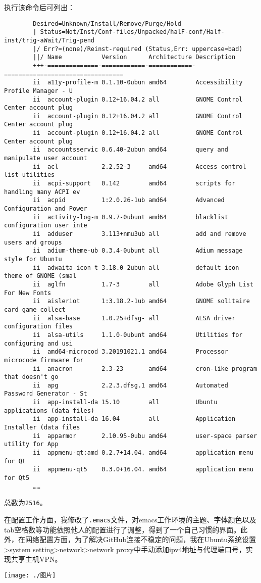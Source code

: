 \documentclass[hyperref,UTF8]{ctexart}
\begin{document}
	执行该命令后可列出：
	\begin{verbatim}
		Desired=Unknown/Install/Remove/Purge/Hold
		| Status=Not/Inst/Conf-files/Unpacked/halF-conf/Half-inst/trig-aWait/Trig-pend
		|/ Err?=(none)/Reinst-required (Status,Err: uppercase=bad)
		||/ Name           Version      Architecture Description
		+++-==============-============-============-=================================
		ii  a11y-profile-m 0.1.10-0ubun amd64        Accessibility Profile Manager - U
		ii  account-plugin 0.12+16.04.2 all          GNOME Control Center account plug
		ii  account-plugin 0.12+16.04.2 all          GNOME Control Center account plug
		ii  account-plugin 0.12+16.04.2 all          GNOME Control Center account plug
		ii  accountsservic 0.6.40-2ubun amd64        query and manipulate user account
		ii  acl            2.2.52-3     amd64        Access control list utilities
		ii  acpi-support   0.142        amd64        scripts for handling many ACPI ev
		ii  acpid          1:2.0.26-1ub amd64        Advanced Configuration and Power 
		ii  activity-log-m 0.9.7-0ubunt amd64        blacklist configuration user inte
		ii  adduser        3.113+nmu3ub all          add and remove users and groups
		ii  adium-theme-ub 0.3.4-0ubunt all          Adium message style for Ubuntu
		ii  adwaita-icon-t 3.18.0-2ubun all          default icon theme of GNOME (smal
		ii  aglfn          1.7-3        all          Adobe Glyph List For New Fonts
		ii  aisleriot      1:3.18.2-1ub amd64        GNOME solitaire card game collect
		ii  alsa-base      1.0.25+dfsg- all          ALSA driver configuration files
		ii  alsa-utils     1.1.0-0ubunt amd64        Utilities for configuring and usi
		ii  amd64-microcod 3.20191021.1 amd64        Processor microcode firmware for 
		ii  anacron        2.3-23       amd64        cron-like program that doesn't go
		ii  apg            2.2.3.dfsg.1 amd64        Automated Password Generator - St
		ii  app-install-da 15.10        all          Ubuntu applications (data files)
		ii  app-install-da 16.04        all          Application Installer (data files
		ii  apparmor       2.10.95-0ubu amd64        user-space parser utility for App
		ii  appmenu-qt:amd 0.2.7+14.04. amd64        application menu for Qt
		ii  appmenu-qt5    0.3.0+16.04. amd64        application menu for Qt5
		……
	\end{verbatim}
	总数为\verb|2516|。
	
	在配置工作方面，我修改了\verb|.emacs|文件，对emacs工作环境的主题、字体颜色以及tab空格数等功能依照他人的配置进行了调整，得到了一个自己习惯的界面。此外，在网络配置方面，为了解决GitHub连接不稳定的问题，我在Ubuntu系统设置>system setting>network>network proxy中手动添加ipv4地址与代理端口号，实现共享主机VPN。
	\begin{center}
		\texttt{[image: ./图片]}
	\end{center}
	
\end{document}
